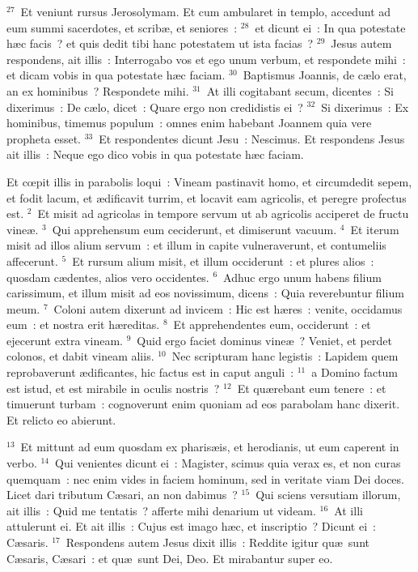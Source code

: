 ${}^{27}$~Et veniunt rursus Jerosolymam. Et cum ambularet in templo, accedunt ad eum summi sacerdotes, et scrib\ae , et seniores~:
${}^{28}$~et dicunt ei~: In qua potestate h\ae c facis~? et quis dedit tibi hanc potestatem ut ista facias~?
${}^{29}$~Jesus autem respondens, ait illis~: Interrogabo vos et ego unum verbum, et respondete mihi~: et dicam vobis in qua potestate h\ae c faciam.
${}^{30}$~Baptismus Joannis, de c\ae lo erat, an ex hominibus~? Respondete mihi.
${}^{31}$~At illi cogitabant secum, dicentes~: Si dixerimus~: De c\ae lo, dicet~: Quare ergo non credidistis ei~?
${}^{32}$~Si dixerimus~: Ex hominibus, timemus populum~: omnes enim habebant Joannem quia vere propheta esset.
${}^{33}$~Et respondentes dicunt Jesu~: Nescimus. Et respondens Jesus ait illis~: Neque ego dico vobis in qua potestate h\ae c faciam.

\lettrine[lines=3,image=true,loversize=0.05,lraise=-0.03]{E}{}t cœpit illis in parabolis loqui~: Vineam pastinavit homo, et circumdedit sepem, et fodit lacum, et \ae dificavit turrim, et locavit eam agricolis, et peregre profectus est.
${}^{2}$~Et misit ad agricolas in tempore servum ut ab agricolis acciperet de fructu vine\ae .
${}^{3}$~Qui apprehensum eum ceciderunt, et dimiserunt vacuum.
${}^{4}$~Et iterum misit ad illos alium servum~: et illum in capite vulneraverunt, et contumeliis affecerunt.
${}^{5}$~Et rursum alium misit, et illum occiderunt~: et plures alios~: quosdam c\ae dentes, alios vero occidentes.
${}^{6}$~Adhuc ergo unum habens filium carissimum, et illum misit ad eos novissimum, dicens~: Quia reverebuntur filium meum.
${}^{7}$~Coloni autem dixerunt ad invicem~: Hic est h\ae res~: venite, occidamus eum~: et nostra erit h\ae reditas.
${}^{8}$~Et apprehendentes eum, occiderunt~: et ejecerunt extra vineam.
${}^{9}$~Quid ergo faciet dominus vine\ae~? Veniet, et perdet colonos, et dabit vineam aliis.
${}^{10}$~Nec scripturam hanc legistis~: Lapidem quem reprobaverunt \ae dificantes, hic factus est in caput anguli~:
${}^{11}$~a Domino factum est istud, et est mirabile in oculis nostris~?
${}^{12}$~Et qu\ae rebant eum tenere~: et timuerunt turbam~: cognoverunt enim quoniam ad eos parabolam hanc dixerit. Et relicto eo abierunt.


${}^{13}$~Et mittunt ad eum quosdam ex pharis\ae is, et herodianis, ut eum caperent in verbo.
${}^{14}$~Qui venientes dicunt ei~: Magister, scimus quia verax es, et non curas quemquam~: nec enim vides in faciem hominum, sed in veritate viam Dei doces. Licet dari tributum C\ae sari, an non dabimus~?
${}^{15}$~Qui sciens versutiam illorum, ait illis~: Quid me tentatis~? afferte mihi denarium ut videam.
${}^{16}$~At illi attulerunt ei. Et ait illis~: Cujus est imago h\ae c, et inscriptio~? Dicunt ei~: C\ae saris.
${}^{17}$~Respondens autem Jesus dixit illis~: Reddite igitur qu\ae\ sunt C\ae saris, C\ae sari~: et qu\ae\ sunt Dei, Deo. Et mirabantur super eo.


